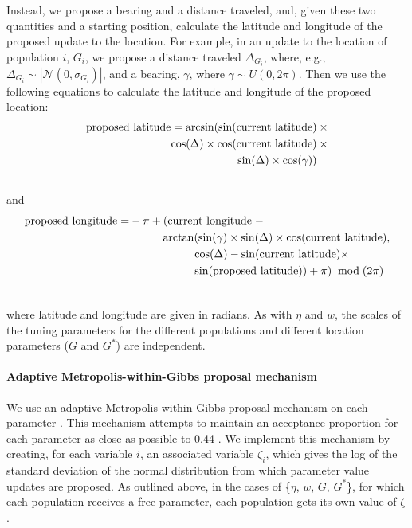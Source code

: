 \documentclass[12pt]{article}
\newcommand{\identifyadmixsource}[1]{{#1^{*}}}
\begin{document}
Instead, we propose a bearing and a distance traveled, and, given these two quantities and a starting position, calculate the latitude and longitude of the proposed update to the location.  For example, in an update to the location of population $i$, $G_i$, we propose a distance traveled $\Delta_{{G}_i}$, where, e.g., $\Delta_{G_i}  \sim | \mathcal{N}(0,\sigma_{{G}_i})|$, and a bearing, $\gamma$, where $\gamma \sim U(0,2\pi)$.  Then we use the following equations to calculate the latitude and longitude of the proposed location:
\begin{align}
\text{proposed latitude} = \arcsin(\sin(\text{current latitude}) \: &\times\\  \notag
					\cos(\Delta) \times \cos(\text{current latitude}) \:&\times\\  \notag
					\sin(\Delta) \times \cos(\gamma))   \:&\phantom{\times}\\  \notag
\end{align}
and
\begin{align}
\text{proposed longitude} = & - \pi + (\text{current longitude} \; - \\ \notag
					 	&\hspace{1cm} \arctan(
							\sin(\gamma) \times
							\sin(\Delta) \times
							\cos(\text{current latitude}) , \\ \notag
						& \hspace{2cm} \cos(\Delta) - 
							\sin(\text{current latitude}) \times \\ \notag
						& \hspace{2cm} \sin(\text{proposed latitude})) + \pi) \; \bmod (2\pi) \\ \notag
\end{align}

where latitude and longitude are given in radians.  As with $\eta$ and $w$, the scales of the tuning parameters for the different populations and different location parameters ($G$ and $\identifyadmixsource{G}$) are independent.


\paragraph{Adaptive Metropolis-within-Gibbs proposal mechanism}
We use an adaptive Metropolis-within-Gibbs proposal mechanism on each parameter \citep{roberts2009examples,rosenthal2010_optimal}.  This mechanism attempts to maintain an acceptance proportion for each parameter as close as possible to 0.44 \citep[optimal for one-dimensional proposal mechanisms;][]{Roberts1997,Roberts2001}.  We implement this mechanism by creating, for each variable $i$, an associated variable $\zeta_i$, which gives the log of the standard deviation of the normal distribution from which parameter value updates are proposed.  As outlined above, in the cases of \{$\eta$, $w$, $G$, $\identifyadmixsource{G}$\}, for which each population receives a free parameter, each population gets its own value of $\zeta$.  
\end{document}
